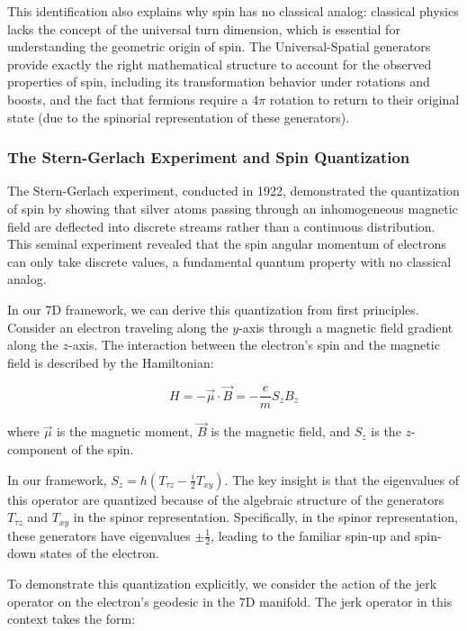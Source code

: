 \documentclass{article}
\begin{document}
This identification also explains why spin has no classical analog: classical physics lacks the concept of the universal turn dimension, which is essential for understanding the geometric origin of spin. The Universal-Spatial generators provide exactly the right mathematical structure to account for the observed properties of spin, including its transformation behavior under rotations and boosts, and the fact that fermions require a $4\pi$ rotation to return to their original state (due to the spinorial representation of these generators).

\subsubsection{The Stern-Gerlach Experiment and Spin Quantization}

The Stern-Gerlach experiment, conducted in 1922, demonstrated the quantization of spin by showing that silver atoms passing through an inhomogeneous magnetic field are deflected into discrete streams rather than a continuous distribution. This seminal experiment revealed that the spin angular momentum of electrons can only take discrete values, a fundamental quantum property with no classical analog.

In our 7D framework, we can derive this quantization from first principles. Consider an electron traveling along the $y$-axis through a magnetic field gradient along the $z$-axis. The interaction between the electron's spin and the magnetic field is described by the Hamiltonian:

\begin{equation}
H = -\vec{\mu} \cdot \vec{B} = -\frac{e}{m}S_z B_z
\end{equation}

where $\vec{\mu}$ is the magnetic moment, $\vec{B}$ is the magnetic field, and $S_z$ is the $z$-component of the spin.

In our framework, $S_z = \hbar(T_{\tau z} - \frac{i}{2}T_{xy})$. The key insight is that the eigenvalues of this operator are quantized because of the algebraic structure of the generators $T_{\tau z}$ and $T_{xy}$ in the spinor representation. Specifically, in the spinor representation, these generators have eigenvalues $\pm \frac{1}{2}$, leading to the familiar spin-up and spin-down states of the electron.

To demonstrate this quantization explicitly, we consider the action of the jerk operator on the electron's geodesic in the 7D manifold. The jerk operator in this context takes the form:
\end{document}
